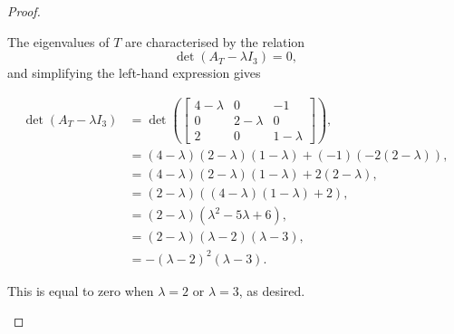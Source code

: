 \begin{enumerate}
\begin{enumerate}
\begin{proof}
\begin{subproof}
                        The eigenvalues of $T$ are characterised by the relation
                        \[ \det(A_T - \lambda I_3) = 0, \]
                        and simplifying the left-hand expression gives
                        \begin{spreadlines}{\baselineskip}
                            \begin{align*}
                                \det(A_T - \lambda I_3) &= \det\left(
                                    \begin{bmatrix}
                                        4 - \lambda & 0 & -1 \\
                                        0 & 2 - \lambda & 0 \\
                                        2 & 0 & 1 - \lambda
                                    \end{bmatrix}
                                \right), \\
                                &= (4 - \lambda) (2 - \lambda) (1 - \lambda) + (-1) \left(-2 (2 - \lambda)\right), \\
                                &= (4 - \lambda) (2 - \lambda) (1 - \lambda) + 2 (2 - \lambda), \\
                                &= (2 - \lambda) \left((4 - \lambda) (1 - \lambda) + 2\right), \\
                                &= (2 - \lambda) (\lambda^2 - 5 \lambda + 6), \\
                                &= (2 - \lambda) (\lambda - 2) (\lambda - 3), \\
                                &= - (\lambda - 2)^2 (\lambda - 3).
                            \end{align*}
                        \end{spreadlines}

                        This is equal to zero when $\lambda = 2$ or $\lambda = 3$, as desired.
                    \end{subproof}

                    \smallskip


\end{proof}
\end{enumerate}
\end{enumerate}
